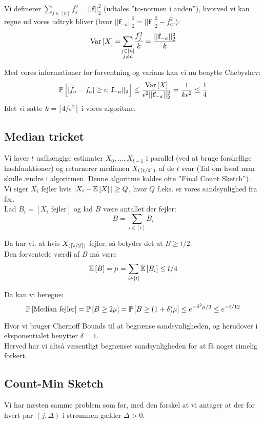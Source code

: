 Vi definerer $\sum_{j \in [n]} f_j^2 = || \mathbf f ||_2^2$ (udtales ''to-normen i anden''), hvorved vi kan regne ud vores udtryk bliver (hvor $|| \mathbf f_{-a} ||_2^2 = || \mathbf f ||_2^2 - f_a^2$.):
$$
\Var{X} = \summ{j \in [n]\\ j \neq a} \frac{f_j^2}{k} = \frac{|| \mathbf f_{-a} ||_2^2}{k}
$$

Med vores informationer for forventning og varians kan vi nu benytte Chebyshev:
$$
\P{|\hat f_a - f_a| \geq \epsilon || \mathbf f_{-a} ||_2}
\leq \frac{\Var{X}}{\epsilon^2 ||\mathbf f_{-a}||_2^2}
= \frac{1}{k \epsilon^2}
\leq \frac{1}{4}
$$
Idet vi satte $k = \ceil{4 / \epsilon^2}$ i vores algoritme.


\subsection{Median tricket}
Vi laver $t$ uafhængige estimater $X_0, \dots, X_{t-1}$ i parallel (ved at bruge forskellige hashfunktioner) og returnerer medianen $X_{(\ceil{t/2})}$ af de $t$ svar (Tal om hvad man skulle ændre i algoritmen. Denne algoritme kaldes ofte ''Final Count Sketch'').\\

Vi siger $X_i$ fejler hvis $|X_i - \E{X}| \geq Q$, hvor $Q$ f.eks. er vores sandsynlighed fra før.\\
Lad $B_i = [X_i \text{ fejler}]$ og lad $B$ være antallet der fejler:
$$
B = \sum_{i \in [t]} B_i
$$


Da har vi, at hvis $X_{(\ceil{t/2})}$ fejler, så betyder det at $B \geq t/2$.\\
Den forventede værdi af $B$ må være
$$
\E{B} = \mu = \sum_{i \in [t]} \E{B_i} \leq t/4
$$

Da kan vi beregne:
$$
\P{\text{Median fejler}}
= \P{B \geq 2 \mu}
= \P{B \geq (1 + \delta) \mu }
\leq e^{- \delta^2 \mu / 3}
\leq e^{-t/12}
$$

Hvor vi bruger Chernoff Bounds til at begrænse sandsynligheden, og herudover i eksponentialet benytter $\delta = 1$.\\

Herved har vi altså væsentligt begrænset sandsynligheden for at få noget rimelig forkert.

\subsection{Count-Min Sketch}
Vi har næsten samme problem som før, med den forskel at vi antager at der for hvert par $(j, \Delta)$ i strømmen gælder $\Delta > 0$.

